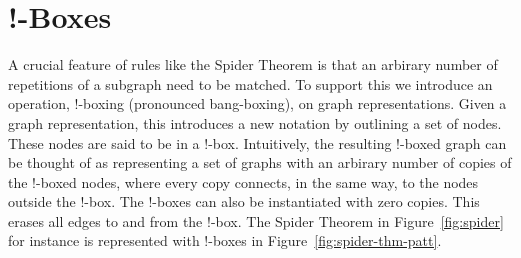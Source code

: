 \documentclass[runningheads]{llncs}
\newcommand{\vinterp}[1]{\lfloor\hspace{-0.27em}|\, #1\, |\hspace{-0.27em}\rfloor}
\begin{document}



\section{!-Boxes}

A crucial feature of rules like the Spider Theorem is that an arbirary
number of repetitions of a subgraph need to be matched. To support
this we introduce an operation, !-boxing (pronounced bang-boxing), on
graph representations. Given a graph representation, this introduces a
new notation by outlining a set of nodes. These nodes are said to be
in a !-box. Intuitively, the resulting !-boxed graph can be thought of
as representing a set of graphs with an arbirary number of copies of
the !-boxed nodes, where every copy connects, in the same way, to the
nodes outside the !-box. The !-boxes can also be instantiated with
zero copies. This erases all edges to and from the !-box.  The Spider
Theorem in Figure~\ref{fig:spider} for instance is
represented with !-boxes in Figure~\ref{fig:spider-thm-patt}.

\end{document}
